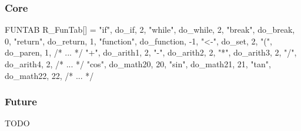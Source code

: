 \documentclass{beamer}
\begin{document}
\begin{frame}[fragile]
    \frametitle{\R{} Core}

\begin{ccode}
FUNTAB R_FunTab[] = {
  {"if",        do_if,        2},
  {"while",     do_while,     2},
  {"break",     do_break,     0},
  {"return",    do_return,    1},
  {"function",  do_function,  -1},
  {"<-",        do_set,       2},
  {"(",         do_paren,     1},
  /* ... */
  {"+",         do_arith1,    2},
  {"-",         do_arith2,    2},
  {"*",         do_arith3,    2},
  {"/",         do_arith4,    2},
  /* ... */
  {"cos",       do_math20,    20},
  {"sin",       do_math21,    21},
  {"tan",       do_math22,    22},
  /* ... */ }
\end{ccode}

    \begin{overlayarea}{\textwidth}{0cm}
    \end{overlayarea}


\end{frame}

\begin{frame}
    \frametitle{Future}

TODO


\end{frame}
\end{document}
